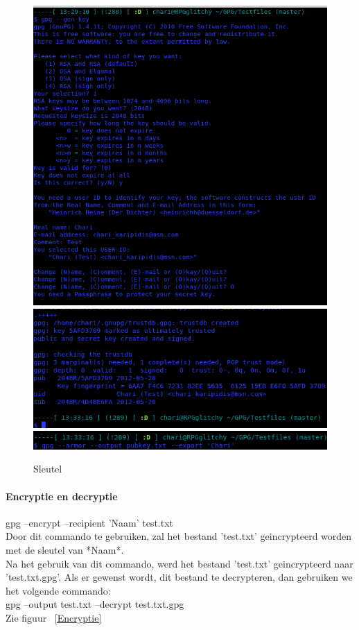 \documentclass[12pt]{article}
\begin{document}
				\begin{figure}
					\begin{center}
						\includegraphics[scale=0.4]{Pictures/Sleutel1}
						\includegraphics[scale=0.4]{Pictures/Sleutel2}
						\includegraphics[scale=0.4]{Pictures/Sleutel3}
					\end{center}
					\caption{Sleutel}\label{Terminal}
				\end{figure}
				
				\paragraph{Encryptie en decryptie} \cite{GPGstart}
				gpg --encrypt --recipient 'Naam' test.txt\\
				Door dit commando te gebruiken, zal het bestand 'test.txt' geincrypteerd worden
				met de sleutel van *Naam*.\\
				Na het gebruik van dit commando, werd het bestand 'test.txt' geincrypteerd naar
				'test.txt.gpg'.
				Als er gewenst wordt, dit bestand te decrypteren, dan gebruiken we het volgende 
				commando:\\
				gpg --output test.txt --decrypt test.txt.gpg\\
				Zie figuur ~\ref{Encryptie}\\
				
\end{document}
